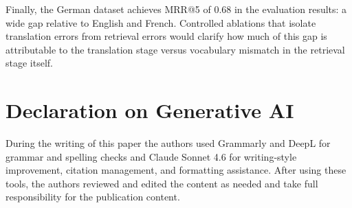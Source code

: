 Finally, the German dataset achieves MRR@5 of 0.68 in the evaluation results: a wide gap relative to English and French. Controlled ablations that isolate translation errors from retrieval errors would clarify how much of this gap is attributable to the translation stage versus vocabulary mismatch in the retrieval stage itself.


\section {Declaration on Generative AI}
During the writing of this paper the authors used Grammarly and DeepL for grammar and spelling checks and Claude Sonnet 4.6 for writing-style improvement, citation management, and formatting assistance. After using these tools, the authors reviewed and edited the content as needed and take full responsibility for the publication content.


\clearpage
